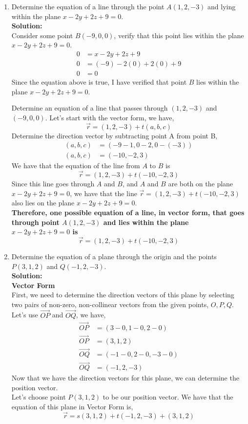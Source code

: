 \documentclass[12pt]{book}
\begin{document}
\begin{enumerate}
\newpage

\item Determine the equation of a line through the point $A(1,2,-3)$ and lying within the plane $x-2y+2z+9=0$.\\

\textbf{Solution:}\\
Consider some point $B(-9,0,0)$, verify that this point lies within the plane $x-2y+2z+9=0$.\\
\setcounter{equation}{0}
\begin{align}
    0 &= x-2y+2z+9 \\
    0 &= (-9)-2(0)+2(0)+9 \\
    0 &= 0
\end{align}
Since the equation above is true, I have verified that point $B$ lies within the plane $x-2y+2z+9=0$.

Determine an equation of a line that passes through $(1,2,-3)$ and $(-9,0,0)$. Let's start with the vector form, we have,
$$\vec{r} = (1,2,-3) + t(a,b,c)$$
Determine the direction vector by subtracting point A from point B,
\begin{align}
    (a,b,c) &= (-9-1,0-2,0-(-3))\\
    (a,b,c) &= (-10,-2,3)
\end{align}
We have that the equation of the line from $A$ to $B$ is $$\vec{r} = (1,2,-3) + t(-10,-2,3)$$
Since this line goes through $A$ and $B$, and $A$ and $B$ are both on the plane $x-2y+2z+9=0$, we have that the line $\vec{r} = (1,2,-3) + t(-10,-2,3)$ also lies on the plane $x-2y+2z+9=0$.\\

\textbf{Therefore, one possible equation of a line, in vector form, that goes through point $A(1,2,-3)$ and lies within the plane $x-2y+2z+9=0$ is $$\vec{r} = (1,2,-3) + t(-10,-2,3)$$}

\newpage

\item Determine the equation of a plane through the origin and the points $P(3,1,2)$ and $Q(-1,2,-3)$.\\

\textbf{Solution:}\\

\textbf{Vector Form}\\
First, we need to determine the direction vectors of this plane by selecting two pairs of non-zero, non-collinear vectors from the given points, $O,P,Q$.\\
Let's use $\vec{OP}$ and $\vec{OQ}$, we have,
\setcounter{equation}{0}
\begin{align}
    \vec{OP} &= (3-0,1-0,2-0) \\
    \vec{OP} &= (3,1,2) \\
    \vec{OQ} &= (-1-0,2-0,-3-0) \\
    \vec{OQ} &= (-1,2,-3)
\end{align}
Now that we have the direction vectors for this plane, we can determine the position vector. \\
Let's choose point $P(3,1,2)$ to be our position vector. We have that the equation of this plane in Vector Form is,
$$\vec{r} = s(3,1,2)+t(-1,2,-3)+(3,1,2)$$


\end{enumerate}
\end{document}
